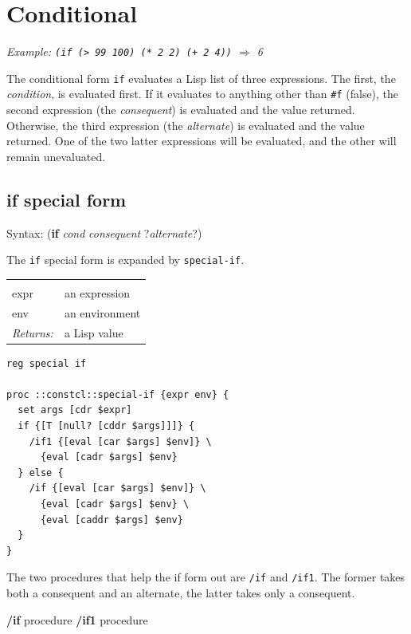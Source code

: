 \documentclass[twoside,9pt]{report}
\begin{document}
\section{Conditional}
\label{conditional}


\emph{Example: \texttt{(if (> 99 100) (* 2 2) (+ 2 4))} $\Rightarrow$ 6}


The conditional form \texttt{if} evaluates a Lisp list of three expressions. The first, the \emph{condition}, is evaluated first. If it evaluates to anything other than \texttt{\#f} (false), the second expression (the \emph{consequent}) is evaluated and the value returned. Otherwise, the third expression (the \emph{alternate}) is evaluated and the value returned. One of the two latter expressions will be evaluated, and the other will remain unevaluated.

\subsection{if special form}
\label{if-special-form}


Syntax: (\textbf{if} \emph{cond} \emph{consequent} ?\emph{alternate}?)


The \texttt{if} special form is expanded by \texttt{special-if}.

\noindent\begin{tabular}{ |p{1.9cm} p{8cm}| }
\hline
\rowcolor[HTML]{CCCCCC} \multicolumn{2}{|l|}{\bf special-if (internal)} \\
expr & an expression \\
env & an environment \\
\textit{Returns:} & a Lisp value \\
\hline
\end{tabular}
\begin{lstlisting}
reg special if

proc ::constcl::special-if {expr env} {
  set args [cdr $expr]
  if {[T [null? [cddr $args]]]} {
    /if1 {[eval [car $args] $env]} \
      {eval [cadr $args] $env}
  } else {
    /if {[eval [car $args] $env]} \
      {eval [cadr $args] $env} \
      {eval [caddr $args] $env}
  }
}
\end{lstlisting}


The two procedures that help the if form out are \texttt{/if} and \texttt{/if1}. The former takes both a consequent and an alternate, the latter takes only a consequent.


\textbf{/if} procedure \textbf{/if1} procedure
\end{document}
